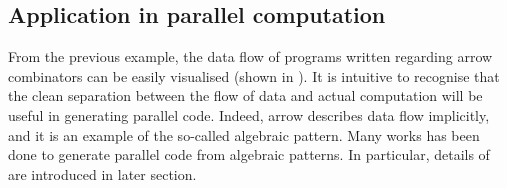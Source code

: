 \subsection{Application in parallel computation}
From the previous example, the data flow of programs written regarding arrow combinators can be easily visualised (shown in ). It is intuitive to recognise that the clean separation between the flow of data and actual computation will be useful in generating parallel code. Indeed, arrow describes data flow implicitly, and it is an example of the so-called algebraic pattern. Many works \cite{braunArrowsParallelComputation2018, elliottGenericFunctionalParallel2017b, AlgebraicMultipartyProtocol} has been done to generate parallel code from algebraic patterns. In particular, details of \cite{AlgebraicMultipartyProtocol} are introduced in later section. %

